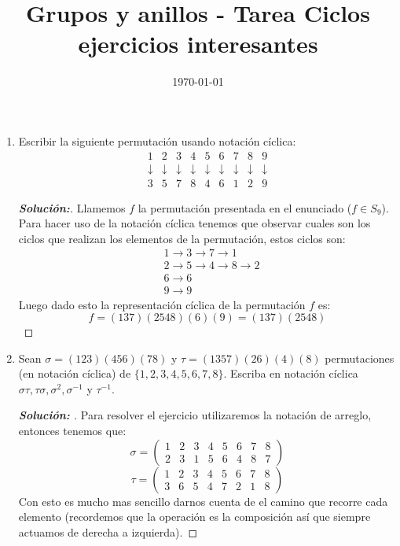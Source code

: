 \documentclass[12pt]{article}
\title{\textbf{Grupos y anillos - Tarea Ciclos ejercicios interesantes}}
\author{
}
\date{\today}
\begin{document}
\maketitle
\begin{enumerate}
    \item Escribir la siguiente permutación usando notación cíclica:
    $$\begin{matrix}
    1 & 2 & 3 & 4 & 5 & 6 & 7 & 8 & 9\\
    \downarrow & \downarrow & \downarrow & \downarrow & \downarrow & \downarrow & \downarrow & \downarrow & \downarrow \\
    3 & 5 & 7 & 8 & 4 & 6 & 1 & 2 & 9
    \end{matrix}$$
    \begin{proof}[\textbf{Solución:}]
    Llamemos $f$ la permutación presentada en el enunciado ($f\in S_9$). Para hacer uso de la notación cíclica tenemos que observar cuales son los ciclos que realizan los elementos de la permutación, estos ciclos son:
    \begin{align*}
        &1\to3\to7\to1\\
        &2\to5\to4\to8\to2\\
        &6\to6\\
        &9\to9
    \end{align*}
    Luego dado esto la representación cíclica de la permutación $f$ es:
    $$f=(137)(2548)(6)(9)=(137)(2548)$$
    \end{proof}
    \item Sean $\sigma=(123)(456)(78)$ y $\tau=(1357)(26)(4)(8)$ permutaciones (en notación cíclica) de $\{1,2,3,4,5,6,7,8\}$. Escriba en notación cíclica $\sigma\tau, \tau\sigma, \sigma^2, \sigma^{-1}$ y $\tau^{-1}$.
    \begin{proof}[\textbf{Solución: }] Para resolver el ejercicio utilizaremos la notación de arreglo, entonces tenemos que:
    $$\sigma=\begin{pmatrix}
    1 & 2 & 3 & 4 & 5 & 6 & 7 & 8\\
    2 & 3 & 1 & 5 & 6 & 4 & 8 & 7
    \end{pmatrix}$$
    $$\tau=\begin{pmatrix}
     1 & 2 & 3 & 4 & 5 & 6 & 7 & 8\\
     3 & 6 & 5 & 4 & 7 & 2 & 1 & 8
    \end{pmatrix}$$
    Con esto es mucho mas sencillo darnos cuenta de el camino que recorre cada elemento (recordemos que la operación es la composición así que siempre actuamos de derecha a izquierda).

\end{proof}
\end{enumerate}
\end{document}
